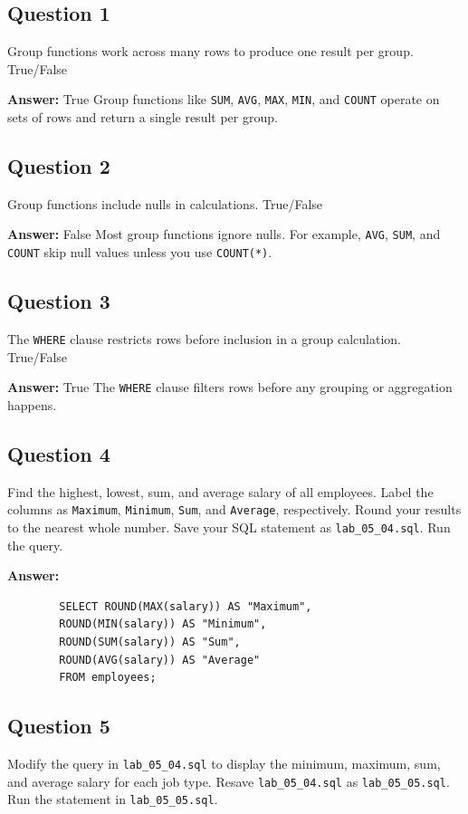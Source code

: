 \documentclass[12pt,a4paper]{article}
\begin{document}
\subsection*{Question 1}
Group functions work across many rows to produce one result per group.
True/False

\textbf{Answer:}
    True
    Group functions like \texttt{SUM}, \texttt{AVG}, \texttt{MAX}, \texttt{MIN}, and \texttt{COUNT} operate on sets of rows and return a single result per group.

\subsection*{Question 2}
Group functions include nulls in calculations.
True/False

\textbf{Answer:}
    False
    Most group functions ignore nulls. For example, \texttt{AVG}, \texttt{SUM}, and \texttt{COUNT} skip null values unless you use \texttt{COUNT(*)}.

\subsection*{Question 3}
The \texttt{WHERE} clause restricts rows before inclusion in a group calculation.
True/False

\textbf{Answer:}
    True
    The \texttt{WHERE} clause filters rows before any grouping or aggregation happens.

\subsection*{Question 4}
Find the highest, lowest, sum, and average salary of all employees. Label the columns
as \texttt{Maximum}, \texttt{Minimum}, \texttt{Sum}, and \texttt{Average}, respectively. Round your results to the nearest 
whole number. Save your SQL statement as \texttt{lab\_05\_04.sql}. Run the query.

\textbf{Answer:}
    \begin{lstlisting}
        SELECT ROUND(MAX(salary)) AS "Maximum",
        ROUND(MIN(salary)) AS "Minimum",
        ROUND(SUM(salary)) AS "Sum",
        ROUND(AVG(salary)) AS "Average"
        FROM employees;
    \end{lstlisting}

\subsection*{Question 5}
Modify the query in \texttt{lab\_05\_04.sql} to display the minimum, maximum, sum, and average 
salary for each job type. Resave \texttt{lab\_05\_04.sql} as \texttt{lab\_05\_05.sql}. Run the statement 
in \texttt{lab\_05\_05.sql}.
\end{document}
